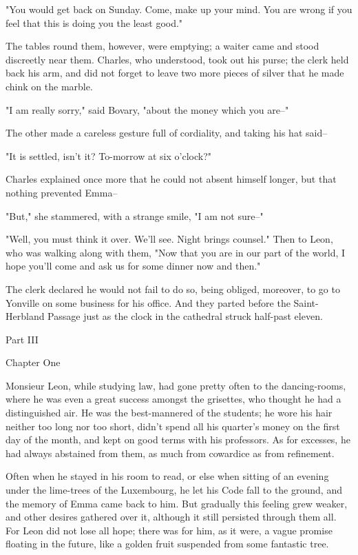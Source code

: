 \documentclass{tufte-book}
\begin{document}
"You would get back on Sunday. Come, make up your mind. You are wrong if
you feel that this is doing you the least good."

The tables round them, however, were emptying; a waiter came and stood
discreetly near them. Charles, who understood, took out his purse; the
clerk held back his arm, and did not forget to leave two more pieces of
silver that he made chink on the marble.

"I am really sorry," said Bovary, "about the money which you are--"

The other made a careless gesture full of cordiality, and taking his hat
said--

"It is settled, isn't it? To-morrow at six o'clock?"

Charles explained once more that he could not absent himself longer, but
that nothing prevented Emma--

"But," she stammered, with a strange smile, "I am not sure--"

"Well, you must think it over. We'll see. Night brings counsel." Then to
Leon, who was walking along with them, "Now that you are in our part of
the world, I hope you'll come and ask us for some dinner now and then."

The clerk declared he would not fail to do so, being obliged, moreover,
to go to Yonville on some business for his office. And they parted
before the Saint-Herbland Passage just as the clock in the cathedral
struck half-past eleven.




Part III



Chapter One

Monsieur Leon, while studying law, had gone pretty often to the
dancing-rooms, where he was even a great success amongst the grisettes,
who thought he had a distinguished air. He was the best-mannered of the
students; he wore his hair neither too long nor too short, didn't spend
all his quarter's money on the first day of the month, and kept on good
terms with his professors. As for excesses, he had always abstained from
them, as much from cowardice as from refinement.

Often when he stayed in his room to read, or else when sitting of an
evening under the lime-trees of the Luxembourg, he let his Code fall to
the ground, and the memory of Emma came back to him. But gradually this
feeling grew weaker, and other desires gathered over it, although it
still persisted through them all. For Leon did not lose all hope; there
was for him, as it were, a vague promise floating in the future, like a
golden fruit suspended from some fantastic tree.
\end{document}

